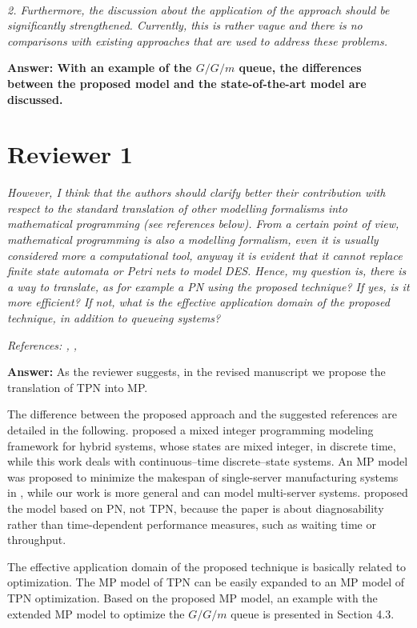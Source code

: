 \documentclass[suppldata]{interact}
\begin{document}
~\\

\textit{2. Furthermore, the discussion about the application of the approach should be significantly strengthened. Currently, this is rather vague and there is no comparisons with existing approaches that are used to address these problems.}

\noindent
\textbf{Answer: With an example of the $G/G/m$ queue, the differences between the proposed model and the state-of-the-art model are discussed.}


\section{Reviewer 1}
\textit{However, I think that the authors should clarify better their contribution with respect to the standard translation of other modelling formalisms into mathematical programming (see references below). From a certain point of view, mathematical programming is also a modelling formalism, even it is usually considered more a computational tool, anyway it is evident that it cannot replace finite state automata or Petri nets to model DES. Hence, my question is, there is a way to translate, as for example a PN using the proposed technique? If yes, is it more efficient? If not, what is the effective application domain of the proposed technique, in addition to queueing systems?}


\textit{References: \cite{basile2012k}, \cite{basile2012k}, \cite{bemporad1999control}}

\noindent
\textbf{Answer:} As the reviewer suggests, %
in the revised manuscript we propose the translation of TPN into MP. 


The difference between the proposed approach and the suggested references are %
detailed in the following. \cite{bemporad1999control} proposed a mixed integer programming modeling framework for hybrid systems, whose states are mixed integer, in discrete time, while this work deals with continuous--time discrete--state systems. An MP model was proposed to minimize the makespan of single-server manufacturing systems in \cite{di2020makespan}, %
while our work is more general and can model multi-server systems. \cite{basile2012k} proposed the model based on PN, not TPN, because %
the paper is about diagnosability %
rather than time-dependent performance measures, such as waiting time or throughput. 


The effective application domain of the proposed technique is basically related to optimization. The MP model of TPN %
can be easily expanded to an MP model of TPN optimization. Based on the proposed MP model, an example with the extended MP model to optimize the $G/G/m$ queue is presented in Section 4.3.
\end{document}
